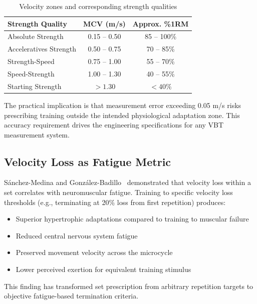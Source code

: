 \begin{table}[h]
    \centering
    \caption{Velocity zones and corresponding strength qualities}
    \label{tab:velocity_zones}
    \begin{tabular}{lcc}
        \toprule
        \textbf{Strength Quality} & \textbf{MCV (m/s)} & \textbf{Approx. \%1RM} \\
        \midrule
        Absolute Strength    & 0.15 -- 0.50 & 85 -- 100\% \\
        Acceleratives Strength & 0.50 -- 0.75 & 70 -- 85\% \\
        Strength-Speed       & 0.75 -- 1.00 & 55 -- 70\% \\
        Speed-Strength       & 1.00 -- 1.30 & 40 -- 55\% \\
        Starting Strength    & $> 1.30$      & $< 40\%$ \\
        \bottomrule
    \end{tabular}
\end{table}

The practical implication is that measurement error exceeding 0.05 m/s risks prescribing training outside the intended physiological adaptation zone. This accuracy requirement drives the engineering specifications for any VBT measurement system.

\subsection{Velocity Loss as Fatigue Metric}

S{\'a}nchez-Medina and Gonz{\'a}lez-Badillo~\cite{sanchez-medina2011} demonstrated that velocity loss within a set correlates with neuromuscular fatigue. Training to specific velocity loss thresholds (e.g., terminating at 20\% loss from first repetition) produces:

\begin{itemize}
    \item Superior hypertrophic adaptations compared to training to muscular failure
    \item Reduced central nervous system fatigue
    \item Preserved movement velocity across the microcycle
    \item Lower perceived exertion for equivalent training stimulus
\end{itemize}

This finding has transformed set prescription from arbitrary repetition targets to objective fatigue-based termination criteria.

